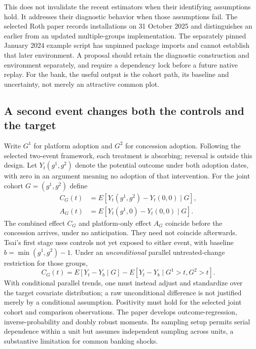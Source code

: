 This does not invalidate the recent estimators when their identifying assumptions hold. It addresses their diagnostic
behavior when those assumptions fail. The selected Roth paper records installations on 31 October 2025 and distinguishes
an earlier from an updated multiple-groups implementation. The separately pinned January 2024 example script has unpinned
package imports and cannot establish that later environment. A proposal should retain the diagnostic construction and
environment separately, and require a dependency lock before a future native replay. For the bank, the useful output is
the cohort path, its baseline and uncertainty, not merely an attractive common plot.~\citep{exec28_panel_roth,exec28_panel_software}

\subsection{A second event changes both the controls and the target}

Write $G^1$ for platform adoption and $G^2$ for concession adoption. Following the selected two-event framework, each
treatment is absorbing; reversal is outside this design. Let $Y_t(g^1,g^2)$ denote the potential outcome under both adoption
dates, with zero in an argument meaning no adoption of that intervention. For the joint cohort $G=(g^1,g^2)$ define
\begin{align*}
 C_G(t)&=E[Y_t(g^1,g^2)-Y_t(0,0)\mid G],\\
 A_G(t)&=E[Y_t(g^1,0)-Y_t(0,0)\mid G].
\end{align*}
The combined effect $C_G$ and platform-only effect $A_G$ coincide before the concession arrives, under no anticipation.
They need not coincide afterwards. Tsai's first stage uses controls not yet exposed to either event, with baseline
$b=\min(g^1,g^2)-1$. Under an \emph{unconditional} parallel untreated-change restriction for those groups,
\[
 C_G(t)=E[Y_t-Y_b\mid G]-E[Y_t-Y_b\mid G^1>t,G^2>t].
\]
With conditional parallel trends, one must instead adjust and standardize over the target covariate distribution; a raw
unconditional difference is not justified merely by a conditional assumption. Positivity must hold for the selected joint
cohort and comparison observations. The paper develops outcome-regression, inverse-probability and doubly robust moments.
Its sampling setup permits serial dependence within a unit but assumes independent sampling across units, a substantive
limitation for common banking shocks.~\citep{exec28_panel_tsai}

